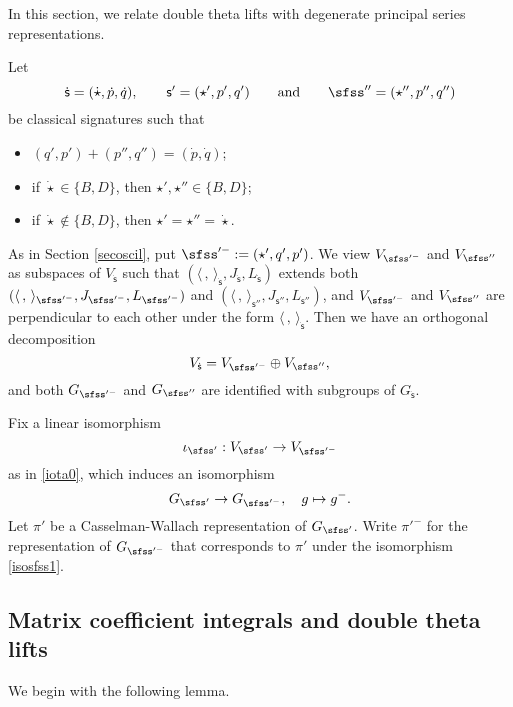 \documentclass[12pt,a4paper]{amsart}
\newcommand{\la}{\langle}
\newcommand{\ra}{\rangle}
\newcommand{\be}{\begin {equation}}
\newcommand{\ee}{\end {equation}}
\numberwithin{equation}{section}
\theoremstyle{remark}
\begin{document}
\def\GLE{\GL(\bfE)^{J_{\bfU}}}
\def\GLEz{\GL_{\bfE_0}}
\def\GLE{{\GL_{\bfE}}}
\def\wtGLE{\widetilde{\GLE}}
\def\wtGLEz{\widetilde{\GLEz}}
\def\wtPE{\widetilde{P_\bfE}}
\def\JU{{J_{\bfU}}}
\def\LU{{L_{\bfU}}}
\def\wtGU{\widetilde{G}_\bfU}
\def\dsfss{{\dot{\mathsf s}}}


In this section, we relate double theta lifts with degenerate principal series representations.

Let
\[
\dot{ \mathsf s}=(\dot \star, \dot p,\dot q),\qquad  \mathsf s'=(\star', p',q')\qquad \textrm{and}\qquad \sfss''=(\star'', p'', q'')
\]
be classical signatures such that
\begin{itemize}
  \item $ (q', p')+(p'', q'')=(\dot p, \dot q)$;\smallskip
  \item if $\dot \star\in \{B,D\}$,  then $\star', \star''\in \{B,D\}$; \smallskip
  \item if $\dot \star\notin \{B,D\}$,  then $\star'=\star''=\dot \star$.
\end{itemize}
As in Section \ref{secoscil}, put $\sfss'^-:=(\star', q', p')$. We view $V_{\sfss'^-}$ and $V_{\sfss''}$ as subspaces of $V_\dsfss$ such that $(\la\,,\,\ra_{\dsfss}, J_{\dsfss},L_{\dsfss})$  extends both $(\la\,,\,\ra_{\sfss'^-}, J_{\sfss'^-}, L_{\sfss'^-})$ and
$(\la\,,\,\ra_{\mathsf s''}, J_{\mathsf s''}, L_{\mathsf s''})$, and $V_{\sfss'^-}$ and $V_{\sfss''}$ are perpendicular to each other under the form $\la\,,\,\ra_{\dsfss}$. Then we have an orthogonal decomposition
\[
  V_\dsfss=V_{\sfss'^-}\oplus V_{\sfss''},
\]
and both $G_{\sfss'^-}$ and $G_{\sfss''}$ are identified with subgroups of $G_{\dsfss}$.

 Fix a linear isomorphism
\be\label{iota1}
 \iota_{\sfss'}:  V_{\sfss'}\rightarrow V_{\sfss'^-}%
\ee
as in \eqref{iota0}, which  induces an isomorphism
\be\label{isosfss1}
 G_{\sfss'}\rightarrow G_{\sfss'^-}, \quad g\mapsto g^-.
\ee
Let $\pi'$ be a Casselman-Wallach representation of $G_{\sfss'}$. Write $\pi'^-$ for the representation of $G_{\sfss'^-}$ that corresponds to $\pi'$ under the isomorphism \eqref{isosfss1}.



\subsection{Matrix coefficient integrals and double theta lifts}

We begin with the following lemma.
\end{document}

